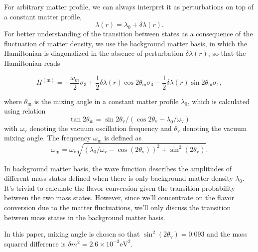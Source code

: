 \documentclass[%
reprint,
 amsmath,amssymb,
 prd,
]{revtex4-1}
\begin{document}
For arbitrary matter profile, we can always interpret it as perturbations on top of a constant matter profile,
\begin{equation}
    \lambda(r) = \lambda_0 + \delta \lambda(r).
    \label{eq-general-matter-profile}
\end{equation}
For better understanding of the transition between states as a consequence of the fluctuation of matter density, we use the background matter basis, in which the Hamiltonian is diagonalized in the absence of perturbation $\delta\lambda(r)$, so that the Hamiltonian reads
\begin{widetext}
\begin{equation}
    H^{(\mathrm{m})} = -\frac{\omega_m}{2} \sigma_3 + \frac{1}{2} \delta\lambda(r) \cos 2\theta_{\mathrm m} \sigma_3
     - \frac{1}{2} \delta\lambda(r) \sin 2\theta_{\mathrm m} \sigma_1,
    \label{eq-hamiltonian-bg-matter-basis-general}
\end{equation}
\end{widetext}
where $\theta_{\mathrm m}$ is the mixing angle in a constant matter profile $\lambda_0$, which is calculated using relation
\begin{equation*}
\tan 2\theta_{\mathrm{m}}=\sin 2\theta_{\mathrm v}/\left( \cos 2\theta_{\mathrm v} - \lambda_0/\omega_{\mathrm v} \right)
\end{equation*}
with $\omega_{\mathrm v}$ denoting the vacuum oscillation frequency and $\theta_{\mathrm v}$ denoting the vacuum mixing angle. The frequency $\omega_{\mathrm m}$ is defined as
\begin{equation}
\omega_{\mathrm{m}} = \omega_{\mathrm{v}} \sqrt{ ( \lambda_0/\omega_{\mathrm{v}} - \cos (2\theta_{\mathrm{v}}) )^2 + \sin^2(2\theta_{\mathrm{v}}) }.
\end{equation}

In background matter basis, the wave function describes the amplitudes of different mass states defined when there is only background matter density $\lambda_0$. It's trivial to calculate the flavor conversion given the transition probability between the two mass states. However, since we'll concentrate on the flavor conversion due to the matter fluctuations, we'll only discuss the transition between mass states in the background matter basis.

In this paper, mixing angle is chosen so that $\sin^2(2\theta_{\mathrm v}) = 0.093$ and the mass squared difference is $\delta m^2 = 2.6\times 10^{-3}\mathrm{eV}^2$.
\end{document}

